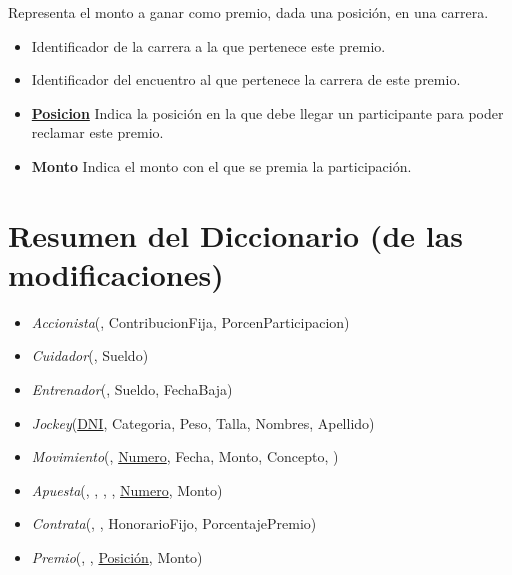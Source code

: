 \documentclass[a4paper,11pt]{article}
\begin{document}
Representa el monto a ganar como premio, dada una posición, en una carrera.

\begin{itemize}

  \item \textbf{\uline{}} Identificador de la carrera
    a la que pertenece este premio.

  \item \textbf{\uline{}} Identificador del
    encuentro al que pertenece la carrera de este premio.

  \item \textbf{\uline{Posicion}} Indica la posición en la que debe llegar un
    participante para poder reclamar este premio.

  \item \textbf{Monto} Indica el monto con el que se premia la participación.

\end{itemize}

\section{Resumen del Diccionario (de las modificaciones)}

\begin{itemize}

  \item \emph{Accionista}(\uline{}, ContribucionFija,
    PorcenParticipacion)

  \item \emph{Cuidador}(\uline{}, Sueldo)

  \item \emph{Entrenador}(\uline{}, Sueldo, FechaBaja)

  \item \emph{Jockey}(\uline{DNI}, Categoria, Peso, Talla, Nombres, Apellido)

  \item \emph{Movimiento}(\uline{}, \uline{Numero},
    Fecha, Monto, Concepto, )

  \item \emph{Apuesta}(\uline{},
    \uline{}, \uline{},
    \uline{}, \uline{Numero}, Monto)

  \item \emph{Contrata}(\uline{},
    \uline{}, HonorarioFijo, PorcentajePremio)

  \item \emph{Premio}(\uline{},
    \uline{}, \uline{Posición}, Monto)

\end{itemize}
\end{document}
